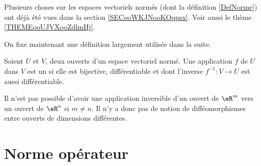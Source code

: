 
Plusieurs choses sur les espaces vectoriels normés (dont la définition \ref{DefNorme}) ont déjà été vues dans la section \ref{SECooWKJNooKOqpsx}. Voir aussi le thème \ref{THEMEooUJVXooZdlmHj}.

On fixe maintenant une définition largement utilisée dans la suite.
\begin{definition}      \label{DefAQIQooYqZdya}
	 Soient $U$ et $V$, deux ouverts d'un espace vectoriel normé. Une application $f$ de $U$ dans $V$ est un  si elle est bijective, différentiable et dont l'inverse $f^{-1}:V\to U $ est aussi différentiable.
\end{definition}

\begin{remark}
	Il n'est pas possible d'avoir une application inversible d'un ouvert de $\eR^m$ vers un ouvert de $\eR^n$ si $m\neq n$. Il n'y a donc pas de notion de difféomorphismes entre ouverts de dimensions différentes.
\end{remark}

\section{Norme opérateur}

